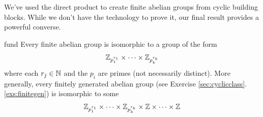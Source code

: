 
We've used the direct product to create finite abelian groups from cyclic building blocks. While we don't have the technology to prove it, our final result provides a powerful converse.

\begin{thm}{}{fund}
	Every finite abelian group is isomorphic to a group of the form
	\[
		\mathbb{Z}_{p_1^{r_1}}\times\cdots\times\mathbb{Z}_{p_k^{r_k}}
	\]
	where each $r_j\in\mathbb{N}$ and the $p_i$ are primes (not necessarily distinct). More generally, every finitely generated abelian group (see Exercise \ref*{sec:cyclicclass}.\ref{exs:finitegen}) is isomorphic to some
	\[
		\mathbb{Z}_{p_1^{r_1}}\times\cdots\times\mathbb{Z}_{p_k^{r_k}}\times\mathbb{Z}\times\cdots\times\mathbb{Z}
	\]
\end{thm}




\goodbreak


